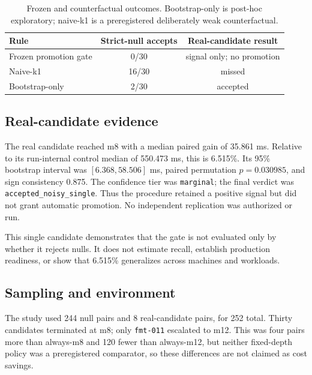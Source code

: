 \documentclass[10pt]{article}
\newcommand{\TotalPairs}{252}
\newcommand{\NullPairs}{244}
\newcommand{\RealPairs}{8}
\newcommand{\RealGainMs}{35.861}
\newcommand{\RealControlMs}{550.473}
\newcommand{\RealGainPct}{6.515\%}
\newcommand{\RealCiLow}{6.368}
\newcommand{\RealCiHigh}{58.506}
\newcommand{\RealPValue}{0.030985}
\newcommand{\RealSign}{0.875}
\begin{document}
\begin{table}[H]
  \centering
  \caption{Frozen and counterfactual outcomes.  Bootstrap-only is post-hoc
  exploratory; naive-k1 is a preregistered deliberately weak counterfactual.}
  \label{tab:decisions}
  \begin{tabular}{@{}lcc@{}}
    \toprule
    Rule & Strict-null accepts & Real-candidate result \\
    \midrule
    Frozen promotion gate & 0/30 & signal only; no promotion \\
    Naive-k1 & 16/30 & missed \\
    Bootstrap-only & 2/30 & accepted \\
    \bottomrule
  \end{tabular}
\end{table}

\subsection{Real-candidate evidence}

The real candidate reached m8 with a median paired gain of \RealGainMs{} ms.
Relative to its run-internal control median of \RealControlMs{} ms, this is
\RealGainPct{}.  Its 95\% bootstrap interval was
$[\RealCiLow{},\RealCiHigh{}]$ ms, paired permutation
$p=\RealPValue{}$, and sign consistency \RealSign{}.  The confidence tier was
\texttt{marginal}; the final verdict was
\texttt{accepted\_noisy\_single}.  Thus the procedure retained a positive
signal but did not grant automatic promotion.  No independent replication was
authorized or run.

This single candidate demonstrates that the gate is not evaluated only by
whether it rejects nulls.  It does not estimate recall, establish production
readiness, or show that \RealGainPct{} generalizes across machines and
workloads.

\subsection{Sampling and environment}

The study used \NullPairs{} null pairs and \RealPairs{} real-candidate pairs,
for \TotalPairs{} total.  Thirty candidates terminated at m8; only
\texttt{fmt-011} escalated to m12.  This was four pairs more than always-m8 and
120 fewer than always-m12, but neither fixed-depth policy was a preregistered
comparator, so these differences are not claimed as cost savings.
\end{document}
